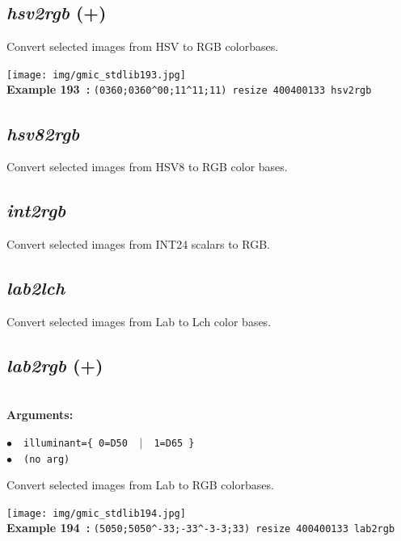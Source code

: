 \documentclass[a4paper,10.5pt,twoside]{book}
\def\comma{\discretionary{,}{}{,}}
\newcommand{\Cb}[1]{\textcolor{cb}{#1}}
\begin{document}
\subsection{\emph{hsv2rgb} (+)}\vspace*{-0.7em}
Convert selected images from HSV to RGB colorbases.
\begin{center}\texttt{[image: img/gmic\_stdlib193.jpg]}\\
{\footnotesize \textbf{Example 193~:} \texttt{(0{\comma}360;0{\comma}360\textasciicircum 0{\comma}0;1{\comma}1\textasciicircum 1{\comma}1;1{\comma}1) resize 400{\comma}400{\comma}1{\comma}3{\comma}3 hsv2rgb}}
\end{center}

\subsection{\emph{hsv82rgb} }\vspace*{-0.7em}
Convert selected images from HSV8 to RGB color bases.


\subsection{\emph{int2rgb} }\vspace*{-0.7em}
Convert selected images from INT24 scalars to RGB.


\subsection{\emph{lab2lch} }\vspace*{-0.7em}
Convert selected images from Lab to Lch color bases.


\subsection{\emph{lab2rgb} (+)}\vspace*{-0.7em}
~\\\textbf{\Cb{Arguments: }}\begin{flushleft}
{\small \Cb{\hspace*{0.5cm}$\bullet$~~\texttt{illuminant=\{ 0=D50 ~$|$~ 1=D65 \}}}}~~~\\
{\small \Cb{\hspace*{0.5cm}$\bullet$~~\texttt{(no arg)}}}\end{flushleft}
Convert selected images from Lab to RGB colorbases.
\begin{center}\texttt{[image: img/gmic\_stdlib194.jpg]}\\
{\footnotesize \textbf{Example 194~:} \texttt{(50{\comma}50;50{\comma}50\textasciicircum -3{\comma}3;-3{\comma}3\textasciicircum -3{\comma}-3;3{\comma}3) resize 400{\comma}400{\comma}1{\comma}3{\comma}3 lab2rgb}}
\end{center}
\end{document}
